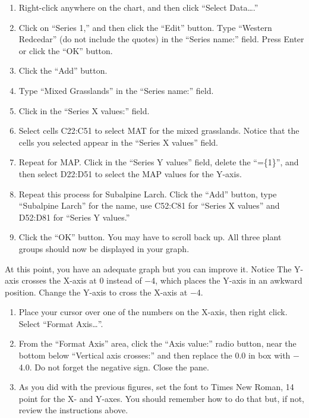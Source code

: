 \documentclass[12pt, hidelinks]{exam}
\begin{document}
\begin{enumerate}[resume]
	\item Right-click anywhere on the chart, and then click “Select Data\dots.”

	\item Click on “Series 1,” and then click the “Edit” button. Type “Western Redcedar” (do not include the quotes) in the “Series name:” field. Press Enter or click the “OK” button.

	\item Click the “Add” button.

	\item Type “Mixed Grasslands” in the “Series name:” field.

	\item Click in the “Series X values:” field.

	\item Select cells C22:C51 to select MAT for the mixed grasslands. Notice that the cells you selected appear in the “Series X values” field.

	\item Repeat for MAP. Click in the “Series Y values” field, delete the “=\{1\}”, and then select D22:D51 to select the MAP values for the Y-axis. 

	\item Repeat this process for Subalpine Larch. Click the “Add” button, type “Subalpine Larch” for the name, use C52:C81 for “Series X values” and D52:D81 for “Series Y values.” 

	\item Click the “OK” button. You may have to scroll back up. All three plant groups should now be displayed in your graph. 
\end{enumerate}

At this point, you have an adequate graph but you can improve it. Notice The Y-axis crosses the X-axis at 0 instead of $-$4, which places the Y-axis in an awkward position. Change the Y-axis to cross the X-axis at $-$4.

\begin{enumerate}[resume]
	\item Place your cursor over one of the numbers on the X-axis, then right click. Select “Format Axis\dots”.

	\item From the “Format Axis” area, click the “Axis value:” radio button, near the bottom below “Vertical axis crosses:” and then replace the 0.0 in box with $-$4.0. Do not forget the negative sign. Close the pane.

	\item As you did with the previous figures, set the font to Times New Roman, 14 point for the X- and Y-axes. You should remember how to do that but, if not, review the instructions above.
\end{enumerate}
\end{document}
